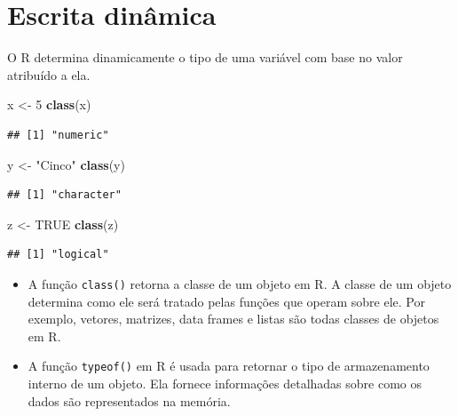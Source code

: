 \documentclass[
]{book}
\newenvironment{Shaded}{\begin{snugshade}}{\end{snugshade}}
\newcommand{\ConstantTok}[1]{\textcolor[rgb]{0.56,0.35,0.01}{#1}}
\newcommand{\DecValTok}[1]{\textcolor[rgb]{0.00,0.00,0.81}{#1}}
\newcommand{\FunctionTok}[1]{\textcolor[rgb]{0.13,0.29,0.53}{\textbf{#1}}}
\newcommand{\NormalTok}[1]{#1}
\newcommand{\OtherTok}[1]{\textcolor[rgb]{0.56,0.35,0.01}{#1}}
\newcommand{\StringTok}[1]{\textcolor[rgb]{0.31,0.60,0.02}{#1}}
\begin{document}
\section{Escrita dinâmica}\label{escrita-dinuxe2mica}

O R determina dinamicamente o tipo de uma variável com base no valor atribuído a ela.

\begin{Shaded}
\begin{Highlighting}[]
\NormalTok{x }\OtherTok{\textless{}{-}} \DecValTok{5}         
\FunctionTok{class}\NormalTok{(x) }
\end{Highlighting}
\end{Shaded}

\begin{verbatim}
## [1] "numeric"
\end{verbatim}

\begin{Shaded}
\begin{Highlighting}[]
\NormalTok{y }\OtherTok{\textless{}{-}} \StringTok{"Cinco"}   
\FunctionTok{class}\NormalTok{(y) }
\end{Highlighting}
\end{Shaded}

\begin{verbatim}
## [1] "character"
\end{verbatim}

\begin{Shaded}
\begin{Highlighting}[]
\NormalTok{z }\OtherTok{\textless{}{-}} \ConstantTok{TRUE}  
\FunctionTok{class}\NormalTok{(z) }
\end{Highlighting}
\end{Shaded}

\begin{verbatim}
## [1] "logical"
\end{verbatim}

\begin{itemize}
\item
  A função \texttt{class()} retorna a classe de um objeto em R. A classe de um objeto determina como ele será tratado pelas funções que operam sobre ele. Por exemplo, vetores, matrizes, data frames e listas são todas classes de objetos em R.
\item
  A função \texttt{typeof()} em R é usada para retornar o tipo de armazenamento interno de um objeto. Ela fornece informações detalhadas sobre como os dados são representados na memória.
\end{itemize}
\end{document}
